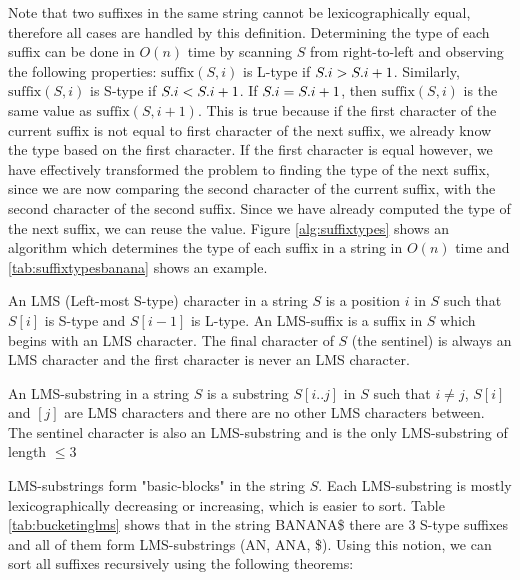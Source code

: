 Note that two suffixes in the same string cannot be lexicographically equal, therefore all
cases are handled by this definition. Determining the type of each suffix can be done in
$O(n)$ time by scanning $S$ from right-to-left and observing the following properties:
$\mathrm{suffix}(S, i)$ is L-type if ${{S}.{i}} > {{S}.{i + 1}}$. Similarly,
$\mathrm{suffix}(S, i)$ is S-type if ${{S}.{i}} < {{S}.{i + 1}}$. If
${{S}.{i}} = {{S}.{i + 1}}$, then $\mathrm{suffix}(S, i)$ is the same value as
$\mathrm{suffix}(S, i + 1)$. This is true because if the first character of the current
suffix is not equal to first character of the next suffix, we already know the type based
on the first character. If the first character is equal however, we have effectively
transformed the problem to finding the type of the next suffix, since we are now comparing
the second character of the current suffix, with the second character of the second
suffix. Since we have already computed the type of the next suffix, we can reuse the value.
Figure \ref{alg:suffixtypes} shows an algorithm which determines the type of each suffix
in a string in $O(n)$ time and \ref{tab:suffixtypesbanana} shows an example.

\begin{definition}

    An LMS (Left-most S-type) character in a string $S$ is a position $i$ in $S$ such that
    $S[i]$ is S-type and $S[i-1]$ is L-type. An LMS-suffix is a suffix in $S$ which begins
    with an LMS character. The final character of $S$ (the sentinel) is always an LMS
    character and the first character is never an LMS character.

\end{definition}

\begin{definition}

    An LMS-substring in a string $S$ is a substring $S[i..j]$ in $S$ such that $i \neq j$,
    $S[i]$ and $[j]$ are LMS characters and there are no other LMS characters between. The
    sentinel character is also an LMS-substring and is the only LMS-substring of length
    $\leq 3$

\end{definition}

LMS-substrings form "basic-blocks" in the string $S$. Each LMS-substring is mostly
lexicographically decreasing or increasing, which is easier to sort. Table
\ref{tab:bucketinglms} shows that in the string BANANA\$ there are 3 S-type suffixes
and all of them form LMS-substrings (AN, ANA, \$). Using this notion, we can sort all
suffixes recursively using the following theorems:


